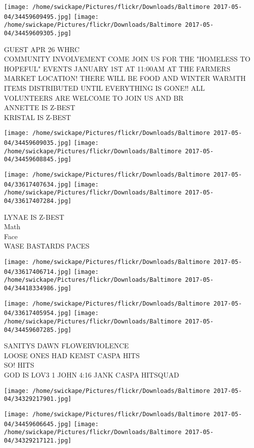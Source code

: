 \documentclass[10pt,letterpaper]{article}
\begin{document}
\texttt{[image: /home/swickape/Pictures/flickr/Downloads/Baltimore 2017-05-04/34459609495.jpg]}
\texttt{[image: /home/swickape/Pictures/flickr/Downloads/Baltimore 2017-05-04/34459609305.jpg]}

GUEST APR 26 WHRC\\
COMMUNITY INVOLVEMENT COME JOIN US FOR THE "HOMELESS TO HOPEFUL" EVENTS JANUARY 1ST AT 11:00AM AT THE FARMERS MARKET LOCATION!  THERE WILL BE FOOD AND WINTER WARMTH ITEMS DISTRIBUTED UNTIL EVERYTHING IS GONE!!  ALL VOLUNTEERS ARE WELCOME TO JOIN US AND BR\\
ANNETTE IS Z{-}BEST\\
KRISTAL IS Z{-}BEST
\pagebreak

\texttt{[image: /home/swickape/Pictures/flickr/Downloads/Baltimore 2017-05-04/34459609035.jpg]}
\texttt{[image: /home/swickape/Pictures/flickr/Downloads/Baltimore 2017-05-04/34459608845.jpg]}

\texttt{[image: /home/swickape/Pictures/flickr/Downloads/Baltimore 2017-05-04/33617407634.jpg]}
\texttt{[image: /home/swickape/Pictures/flickr/Downloads/Baltimore 2017-05-04/33617407284.jpg]}

LYNAE IS Z{-}BEST\\
Math\\
Face\\
WASE BASTARDS PACES
\pagebreak

\texttt{[image: /home/swickape/Pictures/flickr/Downloads/Baltimore 2017-05-04/33617406714.jpg]}
\texttt{[image: /home/swickape/Pictures/flickr/Downloads/Baltimore 2017-05-04/34418334986.jpg]}

\texttt{[image: /home/swickape/Pictures/flickr/Downloads/Baltimore 2017-05-04/33617405954.jpg]}
\texttt{[image: /home/swickape/Pictures/flickr/Downloads/Baltimore 2017-05-04/34459607285.jpg]}

SANITYS DAWN FLOWERVIOLENCE\\
LOOSE ONES HAD KEMST CASPA HITS\\
SO!  HITS\\
GOD IS LOV3 1 JOHN 4:16 JANK CASPA HITSQUAD
\pagebreak

\texttt{[image: /home/swickape/Pictures/flickr/Downloads/Baltimore 2017-05-04/34329217901.jpg]}

\vspace{0.25in}
\texttt{[image: /home/swickape/Pictures/flickr/Downloads/Baltimore 2017-05-04/34459606645.jpg]}
\texttt{[image: /home/swickape/Pictures/flickr/Downloads/Baltimore 2017-05-04/34329217121.jpg]}
\end{document}

